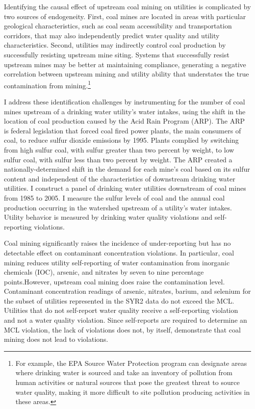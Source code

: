 \documentclass[12pt]{article}
\begin{document}
Identifying the causal effect of upstream coal mining on utilities is complicated by two sources of endogeneity. First, coal mines are located in areas with particular geological characteristics, such as coal seam accessibility and transportation corridors, that may also independently predict water quality and utility characteristics. Second, utilities may indirectly control coal production by successfully resisting upstream mine siting. Systems that successfully resist upstream mines may be better at maintaining compliance, generating a negative correlation between upstream mining and utility ability that understates the true contamination from mining.\footnote{For example, the EPA Source Water Protection program can designate areas where drinking water is sourced and take an inventory of pollution from human activities or natural sources that pose the greatest threat to source water quality, making it more difficult to site pollution producing activities in these areas.}

I address these identification challenges by instrumenting for the number of coal mines upstream of a drinking water utility's water intakes, using the shift in the location of coal production caused by the Acid Rain Program (ARP). The ARP is federal legislation that forced coal fired power plants, the main consumers of coal, to reduce sulfur dioxide emissions by 1995. Plants complied by switching from high sulfur coal, with sulfur greater than two percent by weight, to low sulfur coal, with sulfur less than two percent by weight. The ARP created a nationally-determined shift in the demand for each mine's coal based on its sulfur content and independent of the characteristics of downstream drinking water utilities. I construct a panel of drinking water utilities downstream of coal mines from 1985 to 2005. I measure the sulfur levels of coal and the annual coal production occurring in the watershed upstream of a utility's water intakes. Utility  behavior is measured by drinking water quality violations and self-reporting violations.
 
Coal mining significantly raises the incidence of under-reporting but has no detectable effect on contaminant concentration violations. In particular, coal mining reduces utility self-reporting of water contamination from inorganic chemicals (IOC), arsenic, and nitrates by seven to nine percentage points.However, upstream coal mining does raise the contamination level. Contaminant concentration readings of arsenic, nitrates, barium, and selenium for the subset of utilities represented in the SYR2 data do not exceed the MCL. Utilities that do not self-report water quality receive a self-reporting violation and not a water quality violation. Since self-reports are required to determine an MCL violation, the lack of violations does not, by itself, demonstrate that coal mining does not lead to violations.
\end{document}
